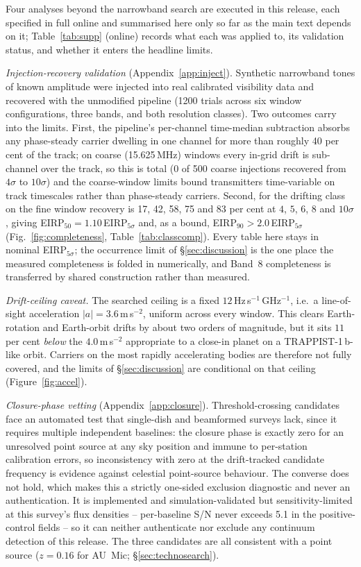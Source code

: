 \documentclass{openjournal}
\begin{document}
Four analyses beyond the narrowband search are executed in this
release, each specified in full online and summarised here only so far
as the main text depends on it; Table~\ref{tab:supp} (online) records
what each was applied to, its validation status, and whether it enters
the headline limits.

\emph{Injection-recovery validation} (Appendix~\ref{app:inject}).
Synthetic narrowband tones of known amplitude were injected into real
calibrated visibility data and recovered with the unmodified pipeline
(1200 trials across six window configurations, three bands, and both
resolution classes). Two outcomes carry into the limits. First, the
pipeline's per-channel time-median subtraction absorbs any
phase-steady carrier dwelling in one channel for more than roughly 40
per cent of the track; on coarse (15.625\,MHz) windows every in-grid
drift is sub-channel over the track, so this is total (0 of 500
coarse injections recovered from $4\sigma$ to $10\sigma$) and the
coarse-window limits bound transmitters time-variable on track
timescales rather than phase-steady carriers. Second, for the
drifting class on the fine window recovery is 17, 42, 58, 75 and 83
per cent at $4$, $5$, $6$, $8$ and $10\sigma$, giving
EIRP$_{50}=1.10\,$EIRP$_{5\sigma}$ and, as a bound,
EIRP$_{90}>2.0\,$EIRP$_{5\sigma}$ (Fig.~\ref{fig:completeness},
Table~\ref{tab:classcomp}). Every table here stays in nominal
EIRP$_{5\sigma}$; the occurrence limit of \S\ref{sec:discussion} is
the one place the measured completeness is folded in numerically, and
Band~8 completeness is transferred by shared construction rather than
measured.

\emph{Drift-ceiling caveat.} The searched ceiling is a fixed
$12$\,Hz\,s$^{-1}$\,GHz$^{-1}$, i.e.\ a line-of-sight acceleration
$|a| = 3.6$\,m\,s$^{-2}$, uniform across every window. This clears
Earth-rotation and Earth-orbit drifts by about two orders of
magnitude, but it sits $11$ per cent \emph{below} the
$4.0$\,m\,s$^{-2}$ appropriate to a close-in planet on a
TRAPPIST-1\,b-like orbit. Carriers on the most rapidly accelerating
bodies are therefore not fully covered, and the limits of
\S\ref{sec:discussion} are conditional on that ceiling
(Figure~\ref{fig:accel}).

\emph{Closure-phase vetting} (Appendix~\ref{app:closure}).
Threshold-crossing candidates face an automated test that single-dish
and beamformed surveys lack, since it requires multiple independent
baselines: the closure phase is exactly zero for an unresolved point
source at any sky position and immune to per-station calibration
errors, so inconsistency with zero at the drift-tracked candidate
frequency is evidence against celestial point-source behaviour. The
converse does not hold, which makes this a strictly one-sided
exclusion diagnostic and never an authentication. It is implemented
and simulation-validated but sensitivity-limited at this survey's flux
densities -- per-baseline S/N never exceeds 5.1 in the positive-control
fields -- so it can neither authenticate nor exclude any continuum
detection of this release. The three candidates are all consistent
with a point source ($z=0.16$ for AU~Mic; \S\ref{sec:technosearch}).
\end{document}

